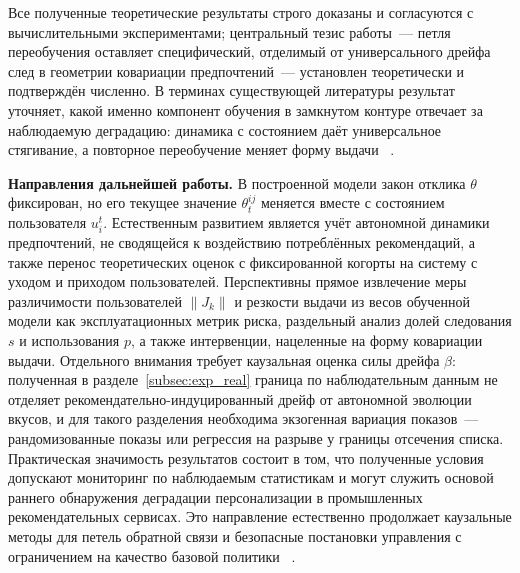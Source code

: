 Все полученные теоретические результаты строго доказаны и согласуются с
вычислительными экспериментами; центральный тезис работы~--- петля переобучения
оставляет специфический, отделимый от универсального дрейфа след в геометрии
ковариации предпочтений~--- установлен теоретически и подтверждён численно. В
терминах существующей литературы результат уточняет, какой именно компонент
обучения в замкнутом контуре отвечает за наблюдаемую деградацию: динамика с
состоянием даёт универсальное стягивание, а повторное переобучение меняет форму выдачи
~\cite{brown2022stateful, hardt2025performativePastFuture,
barlacchi2026diversityParadox}.

\textbf{Направления дальнейшей работы.} В построенной модели закон отклика
$\theta$ фиксирован, но его текущее значение $\theta_t^{ij}$ меняется вместе с
состоянием пользователя $u_i^t$. Естественным развитием является учёт автономной
динамики предпочтений, не сводящейся к воздействию потреблённых рекомендаций, а
также перенос теоретических оценок с фиксированной когорты на систему с уходом и
приходом пользователей. Перспективны прямое извлечение меры различимости пользователей
$\lVert J_k\rVert$ и резкости выдачи из весов обученной модели как эксплуатационных
метрик риска, раздельный анализ долей следования $s$ и использования $p$, а также
интервенции, нацеленные на форму ковариации выдачи. Отдельного внимания требует
каузальная оценка силы дрейфа $\beta$: полученная в
разделе~\ref{subsec:exp_real} граница по наблюдательным данным не отделяет
рекомендательно-индуцированный дрейф от автономной эволюции вкусов, и для такого
разделения необходима экзогенная вариация показов~--- рандомизованные показы
или регрессия на разрыве у границы отсечения списка. Практическая значимость
результатов состоит в том, что полученные условия допускают мониторинг по
наблюдаемым статистикам и могут служить основой раннего обнаружения деградации
персонализации в промышленных рекомендательных сервисах. Это направление
естественно продолжает каузальные методы для петель обратной связи и безопасные
постановки управления с ограничением на качество базовой политики
~\cite{krauth2022, chow2014baselineControl, chandrasekaran2026networkAware}.
